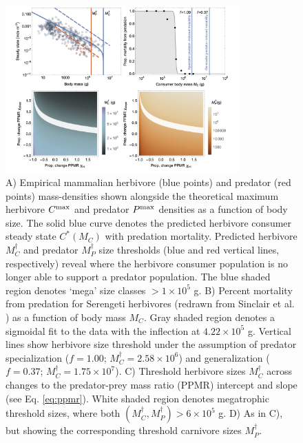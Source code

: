 \documentclass[11pt]{article}
\begin{document}
\begin{figure}[H]
  \centering
  \includegraphics[width=0.8\textwidth]{fig_predation_alltogether.png}
  \caption{
  \footnotesize
	  A) Empirical mammalian herbivore (blue points) and predator (red points) mass-densities shown alongside the theoretical maximum herbivore $C^{\rm max}$ and predator $P^{\rm max}$ densities as a function of body size. 
	  The solid blue curve denotes the predicted herbivore consumer steady state $C^*(M_C)$ with predation mortality.
	  Predicted herbivore $M_C^\dagger$ and predator $M_P^\dagger$ size thresholds (blue and red vertical lines, respectively) reveal where the herbivore consumer population is no longer able to support a predator population. 
	  The blue shaded region denotes `mega' size classes $>1\times10^5$ g.
	  B) Percent mortality from predation for Serengeti herbivores (redrawn from Sinclair et al. \citep{Sinclair2003}) as a function of body mass $M_C$. Gray shaded region denotes a sigmoidal fit to the data with the inflection at $4.22\times10^5$ g. Vertical lines show herbivore size threshold under the assumption of predator specialization ($f=1.00$; $M_C^\dagger=2.58\times10^6$) and generalization ($f=0.37$; $M_C^\dagger=1.75\times10^7$).
	  C) Threshold herbivore sizes $M_C^\dagger$ across changes to the predator-prey mass ratio (PPMR) intercept and slope (see Eq. \ref{eq:ppmr}).
	  White shaded region denotes megatrophic threshold sizes, where both $(M_C^\dagger,M_P^\dagger) > 6\times10^5$ g. 
	  D) As in C), but showing the corresponding threshold carnivore sizes $M_P^\dagger$.
  }
  \label{fig:predrate}
\end{figure}
\end{document}
